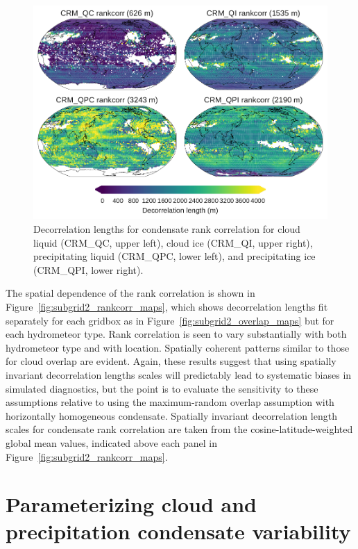 \begin{figure}[htbp]
\centering
\includegraphics{graphics/subgrid2_rankcorr_maps.pdf}
\caption{\label{fig:subgrid2_rankcorr_maps}Decorrelation lengths for
condensate rank correlation for cloud liquid (CRM\_QC, upper left),
cloud ice (CRM\_QI, upper right), precipitating liquid (CRM\_QPC, lower
left), and precipitating ice (CRM\_QPI, lower
right).}\label{fig:subgrid2ux5frankcorrux5fmaps}
\end{figure}

The spatial dependence of the rank correlation is shown in
Figure~\ref{fig:subgrid2_rankcorr_maps}, which shows decorrelation
lengths fit separately for each gridbox as in
Figure~\ref{fig:subgrid2_overlap_maps} but for each hydrometeor type.
Rank correlation is seen to vary substantially with both hydrometeor
type and with location. Spatially coherent patterns similar to those for
cloud overlap are evident. Again, these results suggest that using
spatially invariant decorrelation lengths scales will predictably lead
to systematic biases in simulated diagnostics, but the point is to
evaluate the sensitivity to these assumptions relative to using the
maximum-random overlap assumption with horizontally homogeneous
condensate. Spatially invariant decorrelation length scales for
condensate rank correlation are taken from the cosine-latitude-weighted
global mean values, indicated above each panel in
Figure~\ref{fig:subgrid2_rankcorr_maps}.

\section{Parameterizing cloud and precipitation condensate
variability}\label{sec:subgrid2Variability}

